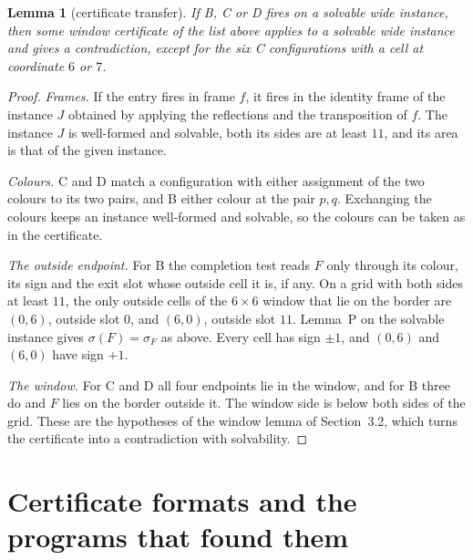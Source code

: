 \documentclass[11pt]{article}
\newtheorem{lemma}{Lemma}
\begin{document}
\begin{lemma}[certificate transfer]\label{lem:transfer}
If B, C or D fires on a solvable wide instance, then some window certificate of the list above
applies to a solvable wide instance and gives a contradiction, except for the six C configurations
with a cell at coordinate $6$ or $7$.
\end{lemma}
\begin{proof}
\emph{Frames.} If the entry fires in frame $f$, it fires in the identity frame of the instance $J$
obtained by applying the reflections and the transposition of $f$. The instance $J$ is well-formed
and solvable, both its sides are at least $11$, and its area is that of the given instance.

\emph{Colours.} C and D match a configuration with either assignment of the two colours to its two
pairs, and B either colour at the pair $p,q$. Exchanging the colours keeps an instance well-formed
and solvable, so the colours can be taken as in the certificate.

\emph{The outside endpoint.} For B the completion test reads $F$ only through its colour, its sign
and the exit slot whose outside cell it is, if any. On a grid with both sides at least $11$, the
only outside cells of the $6\times 6$ window that lie on the border are $(0,6)$, outside slot $0$,
and $(6,0)$, outside slot $11$. Lemma~P on the solvable instance gives
$\sigma(F)=\sigma_F$ as above. Every cell has sign $\pm 1$, and $(0,6)$ and $(6,0)$ have sign $+1$.

\emph{The window.} For C and D all four endpoints lie in the window, and for B three do and $F$
lies on the border outside it. The window side is below both sides of the grid. These are the
hypotheses of the window lemma of Section~3.2, which turns the certificate into a contradiction
with solvability.
\end{proof}

\section{Certificate formats and the programs that found them}\label{sec:certs}
\end{document}
